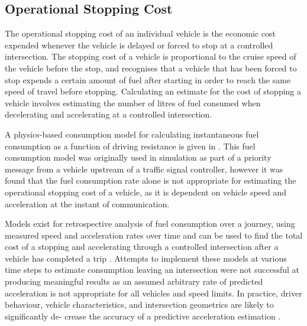 \subsection{Operational Stopping Cost}

The operational stopping cost of an individual vehicle is the economic cost expended whenever the vehicle is delayed or forced to stop at a controlled intersection. The stopping cost of a vehicle is proportional to the cruise speed of the vehicle before the stop, and recognises that a vehicle that has been forced to stop expends a certain amount of fuel after starting in order to reach the same speed of travel before stopping. Calculating an estimate for the cost of stopping a vehicle involves estimating the number of litres of fuel consumed when decelerating and accelerating at a controlled intersection.

A physics-based consumption model for calculating instantaneous fuel consumption as a function of driving resistance is given in \cite{kesting2013traffic}. This fuel consumption model was originally used in simulation as part of a priority message from a vehicle upstream of a traffic signal controller, however it was found that the fuel consumption rate alone is not appropriate for estimating the operational stopping cost of a vehicle, as it is dependent on vehicle speed and acceleration at the instant of communication.

Models exist for retrospective analysis of fuel consumption over a journey, using measured speed and acceleration rates over time and can be used to find the total cost of a stopping and accelerating through a controlled intersection after a vehicle has completed a trip \cite{kesting2013traffic,akcelik2003fuel,trieber2008congestion}. Attempts to implement these models at various time steps to estimate consumption leaving an intersection were not successful at producing meaningful results as an assumed arbitrary rate of predicted acceleration is not appropriate for all vehicles and speed limits. In practice, driver behaviour, vehicle characteristics, and intersection geometrics are likely to significantly de- crease the accuracy of a predictive acceleration estimation \cite{kesting2013traffic}.

